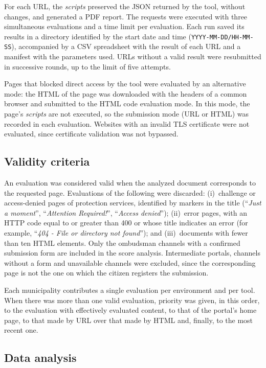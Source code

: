 \documentclass[12pt]{article}
\begin{document}
For each URL, the \textit{scripts} preserved the JSON returned by the tool, without changes, and generated a PDF report. The requests were executed with three simultaneous evaluations and a time limit per evaluation. Each run saved its results in a directory identified by the start date and time (\texttt{YYYY-MM-DD/HH-MM-SS}), accompanied by a CSV spreadsheet with the result of each URL and a manifest with the parameters used. URLs without a valid result were resubmitted in successive rounds, up to the limit of five attempts.

Pages that blocked direct access by the tool were evaluated by an alternative mode: the HTML of the page was downloaded with the headers of a common browser and submitted to the HTML code evaluation mode. In this mode, the page's \textit{scripts} are not executed, so the submission mode (URL or HTML) was recorded in each evaluation. Websites with an invalid TLS certificate were not evaluated, since certificate validation was not bypassed.

\subsection{Validity criteria}

An evaluation was considered valid when the analyzed document corresponds to the requested page. Evaluations of the following were discarded:
(i)~challenge or access-denied pages of protection services, identified by markers in the title (``\textit{Just a moment}'', ``\textit{Attention Required!}'', ``\textit{Access denied}'');
(ii)~error pages, with an HTTP code equal to or greater than 400 or whose title indicates an error (for example, ``\textit{404 - File or directory not found}''); and
(iii)~documents with fewer than ten HTML elements.
Only the ombudsman channels with a confirmed submission form are included in the score analysis. Intermediate portals, channels without a form and unavailable channels were excluded, since the corresponding page is not the one on which the citizen registers the submission.

Each municipality contributes a single evaluation per environment and per tool. When there was more than one valid evaluation, priority was given, in this order, to the evaluation with effectively evaluated content, to that of the portal's home page, to that made by URL over that made by HTML and, finally, to the most recent one.

\subsection{Data analysis}
\end{document}
